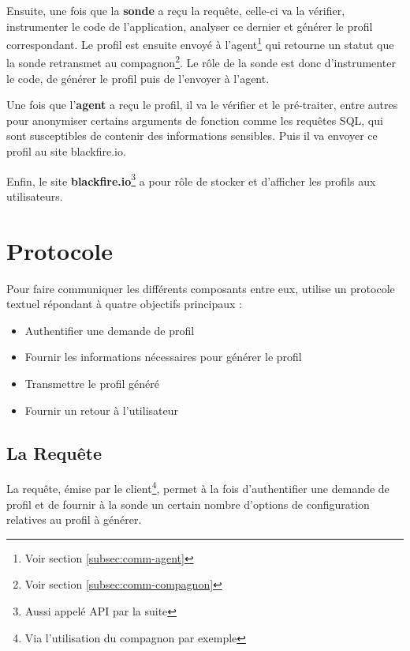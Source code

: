 Ensuite, une fois que la \textbf{sonde} a reçu la requête, celle-ci va la vérifier, instrumenter le code de l'application, analyser ce dernier et générer le profil correspondant. Le profil est ensuite envoyé à l'agent\footnote{Voir section \vref{subsec:comm-agent}} qui retourne un statut que la sonde retransmet au compagnon\footnote{Voir section \vref{subsec:comm-compagnon}}. Le rôle de la sonde est donc d'instrumenter le code, de générer le profil puis de l'envoyer à l'agent.

Une fois que l'\textbf{agent} a reçu le profil, il va le vérifier et le pré-traiter, entre autres pour anonymiser certains arguments de fonction comme les requêtes SQL, qui sont susceptibles de contenir des informations sensibles. Puis il va envoyer ce profil au site blackfire.io.

Enfin, le site \textbf{blackfire.io}\footnote{Aussi appelé API par la suite} a pour rôle de stocker et d'afficher les profils aux utilisateurs.

		\section{Protocole}
			\label{sec:BlackfireProtocol}
Pour faire communiquer les différents composants entre eux, \Blackfire utilise un protocole textuel répondant à quatre objectifs principaux :
\begin{itemize}
\item Authentifier une demande de profil
\item Fournir les informations nécessaires pour générer le profil
\item Transmettre le profil généré
\item Fournir un retour à l'utilisateur
\end{itemize}

\clearpage
			\subsection{La Requête}
			\label{subsec:BlackfireQuery}
La requête, émise par le client\footnote{Via l'utilisation du compagnon par exemple}, permet à la fois d'authentifier une demande de profil et de fournir à la sonde un certain nombre d'options de configuration relatives au profil à générer.

